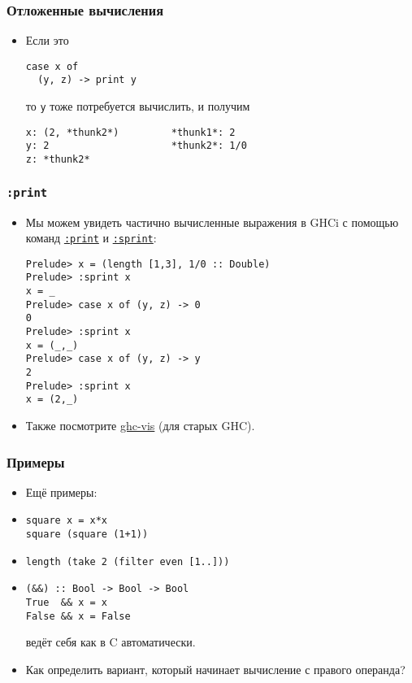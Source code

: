 \documentclass[11pt]{beamer}
\begin{document}
\begin{frame}[fragile]
\frametitle{Отложенные вычисления}
\begin{itemize}
    \item Если это
\begin{lstlisting}[basicstyle=\ttfamily\small]
case x of
  (y, z) -> print y
\end{lstlisting}
то \lstinline|y| тоже потребуется вычислить, и получим \pause
\begin{lstlisting}[basicstyle=\ttfamily\small]
x: (2, *thunk2*)         *thunk1*: 2
y: 2                     *thunk2*: 1/0
z: *thunk2*
\end{lstlisting}
\end{itemize}
\end{frame}

\begin{frame}[fragile]
\frametitle{\lstinline|:print|}
\begin{itemize}
    \item Мы можем увидеть частично вычисленные выражения в GHCi с помощью команд \href{https://downloads.haskell.org/~ghc/8.6.3/docs/html/users_guide/ghci.html#ghci-cmd-:print}{\lstinline|:print|} и \href{https://downloads.haskell.org/~ghc/8.6.3/docs/html/users_guide/ghci.html#ghci-cmd-:sprint}{\lstinline|:sprint|}:
\begin{lstlisting}[basicstyle=\ttfamily\small]
Prelude> x = (length [1,3], 1/0 :: Double)
Prelude> :sprint x
x = _
Prelude> case x of (y, z) -> 0
0
Prelude> :sprint x
x = (_,_)
Prelude> case x of (y, z) -> y
2
Prelude> :sprint x
x = (2,_)
\end{lstlisting}
    \pause
    \item Также посмотрите \href{http://felsin9.de/nnis/ghc-vis/}{ghc-vis} (для старых GHC).
\end{itemize}
\end{frame}

\begin{frame}[fragile]
\frametitle{Примеры}
\begin{itemize}
    \item Ещё примеры:
    \pause
    \item
\begin{lstlisting}
square x = x*x
square (square (1+1))
\end{lstlisting}
    \item \lstinline|length (take 2 (filter even [1..]))|
\pause
    \item 
\begin{lstlisting}
(&&) :: Bool -> Bool -> Bool
True  && x = x
False && x = False
\end{lstlisting}
    ведёт себя как в C автоматически.
    \pause
    \item Как определить вариант, который начинает вычисление с правого операнда?
\end{itemize}
\end{frame}
\end{document}
